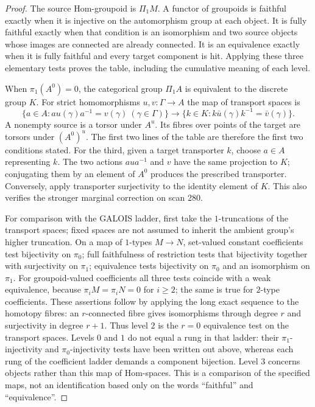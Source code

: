 \begin{proof}
The source Hom-groupoid is $\Pi_1M$. A functor of groupoids is faithful
exactly when it is injective on the automorphism group at each object.
It is fully faithful exactly when that condition is an isomorphism and
two source objects whose images are connected are already connected.
It is an equivalence exactly when it is fully faithful and every target
component is hit. Applying these three elementary tests proves the
table, including the cumulative meaning of each level.

When $\pi_1(A^0)=0$, the categorical group $\Pi_1A$ is equivalent to the
discrete group $K$. For strict homomorphisms $u,v:\Gamma\to A$ the map
of transport spaces is
\[
 \{a\in A:a u(\gamma)a^{-1}=v(\gamma)\ (\gamma\in\Gamma)\}
 \longrightarrow
 \{k\in K:k\bar u(\gamma)k^{-1}=\bar v(\gamma)\}.
\]
A nonempty source is a torsor under $A^u$. Its fibres over points of the
target are torsors under $(A^0)^u$. The first two lines of the table are
therefore the first two conditions stated. For the third, given a target
transporter $k$, choose $a\in A$ representing $k$. The two actions
$a u a^{-1}$ and $v$ have the same projection to $K$; conjugating them
by an element of $A^0$ produces the prescribed transporter. Conversely,
apply transporter surjectivity to the identity element of $K$. This
also verifies the stronger marginal correction on scan 280.

For comparison with the GALOIS ladder, first take the $1$-truncations
of the transport spaces; fixed spaces are not assumed to inherit the
ambient group's higher truncation. On a map of $1$-types $M\to N$, set-valued constant coefficients test bijectivity on $\pi_0$;
full faithfulness of restriction tests that bijectivity together with
surjectivity on $\pi_1$; equivalence tests bijectivity on $\pi_0$ and an
isomorphism on $\pi_1$. For groupoid-valued coefficients all three tests
coincide with a weak equivalence, because $\pi_iM=\pi_iN=0$ for $i\geq2$;
the same is true for $2$-type coefficients. These assertions follow by
applying the long exact sequence to the homotopy fibres: an $r$-connected
fibre gives isomorphisms through degree $r$ and surjectivity in degree
$r+1$. Thus level $2$ is the $r=0$ equivalence test on the transport
spaces. Levels $0$ and $1$ do not equal a rung in that ladder: their
$\pi_1$-injectivity and $\pi_0$-injectivity tests have been written out
above, whereas each rung of the coefficient ladder demands a component
bijection. Level $3$ concerns objects rather than this map of Hom-spaces.
This is a comparison of the specified maps, not an identification based
only on the words ``faithful'' and ``equivalence''.
\end{proof}

